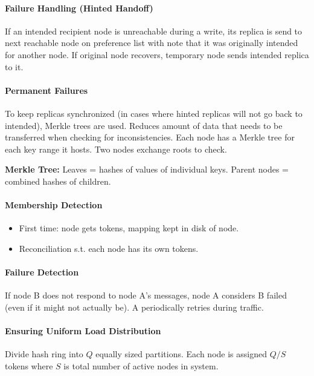 
\paragraph{Failure Handling (Hinted Handoff)}
If an intended recipient node is unreachable during a write, its replica is send to next reachable node on preference list with note that it was originally intended for another node. If original node recovers, temporary node sends intended replica to it.

\paragraph{Permanent Failures}
To keep replicas synchronized (in cases where hinted replicas will not go back to intended), Merkle trees are used. Reduces amount of data that needs to be transferred when checking for inconsistencies. Each node has a Merkle tree for each key range it hosts. Two nodes exchange roots to check.

\textbf{Merkle Tree:} Leaves = hashes of values of individual keys. Parent nodes = combined hashes of children. %

\paragraph{Membership Detection}
\begin{itemize}
    \item First time: node gets tokens, mapping kept in disk of node.
    \item Reconciliation s.t. each node has its own tokens. %
\end{itemize}

\paragraph{Failure Detection}
If node B does not respond to node A's messages, node A considers B failed (even if it might not actually be). A periodically retries during traffic.

\paragraph{Ensuring Uniform Load Distribution}
Divide hash ring into $Q$ equally sized partitions. Each node is assigned $Q/S$ tokens where $S$ is total number of active nodes in system. %




